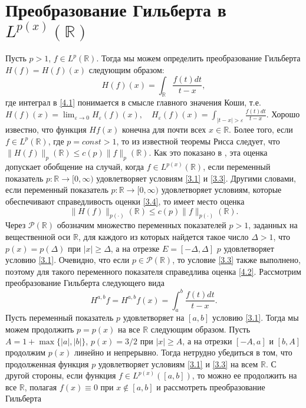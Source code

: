 \section{Преобразование Гильберта в $L^{p(x)}(\mathbb{R})$}
Пусть $p>1$, $f\in L^{p}(\mathbb{R})$. Тогда мы можем определить преобразование Гильберта $H(f)=H(f)(x)$ следующим образом:
\begin{equation}\label{4.1}
H(f)(x)=\int_{\mathbb{R}}\frac{f(t)dt}{t-x},
\end{equation}
 где интеграл в \eqref{4.1} понимается в смысле главного значения Коши, т.е. \linebreak
$
H(f)(x)=\lim_{\varepsilon\to0}H_\varepsilon(f)(x),\quad H_\varepsilon(f)(x)=\int_{|t-x|>\varepsilon}\frac{f(t)dt}{t-x}.
$
Хорошо известно, что функция $Hf(x)$ конечна для почти всех $x\in\mathbb{R}$. Более того, если $f\in L^p(\mathbb{R})$, где $p=const>1$, то из известной теоремы Рисса  следует, что
$\|H(f)\|_p(\mathbb{R})\le c(p)\|f\|_p(\mathbb{R})$. Как это показано в \cite{ShIIBJWCruz-Uribe,ShIIBJWDiening}, эта оценка допускает обобщение на случай, когда $f\in L^{p(x)}(\mathbb{R})$, если переменный показатель  $p:\mathbb{R}\to[0,\infty)$ удовлетворяет условиям \eqref{3.1} и \eqref{3.3}. Другими словами, если переменный показатель  $p:\mathbb{R}\to[0,\infty)$ удовлетворяет условиям, которые обеспечивают справедливость оценки \eqref{3.4}, то имеет место оценка
\begin{equation}\label{4.2}
\|H(f)\|_{p(\cdot)}(\mathbb{R})\le c(p)\|f\|_{p(\cdot)}(\mathbb{R}).
\end{equation}
Через $\mathcal{ P}(\mathbb{R})$ обозначим множество переменных показателей $p>1$, заданных на вещественной оси  $\mathbb{R}$, для каждого из которых найдется такое число $\Delta>1$, что $p(x)=p(\Delta)$ при $|x|\ge \Delta$, а на отрезке $E=[-\Delta,\Delta]$ $p$ удовлетворяет условию \eqref{3.1}.
Очевидно, что если $p\in \mathcal{ P}(\mathbb{R})$, то условие \eqref{3.3} также выполнено, поэтому для такого переменного показателя справедлива оценка \eqref{4.2}.
Рассмотрим  преобразование Гильберта следующего вида
\begin{equation}\label{4.3}
H^{a,b}f=H^{a,b}f(x)=\int_{a}^{b}\frac{f(t)dt}{t-x}.
\end{equation}
Пусть переменный показатель $p$ удовлетворяет на $[a,b]$ условию \eqref{3.1}. Тогда мы можем продолжить $p=p(x)$ на все $\mathbb{R}$ следующим образом. Пусть $A=1 +\max\{|a|,|b|\}$, $p(x)=3/2$ при $|x|\ge A$, а на отрезки $[-A,a]$ и $[b,A]$ продолжим $p(x)$ линейно и непрерывно. Тогда нетрудно убедиться в том, что  продолженная функция $p$ удовлетворяет условиям \eqref{3.1} и \eqref{3.3} на всем $\mathbb{R}$. С  другой стороны, если функция $f\in L^{p(x)}([a,b])$, то можно ее продолжить на все $\mathbb{R}$, полагая $f(x)\equiv0$ при $x\notin[a,b]$ и рассмотреть преобразование Гильберта
